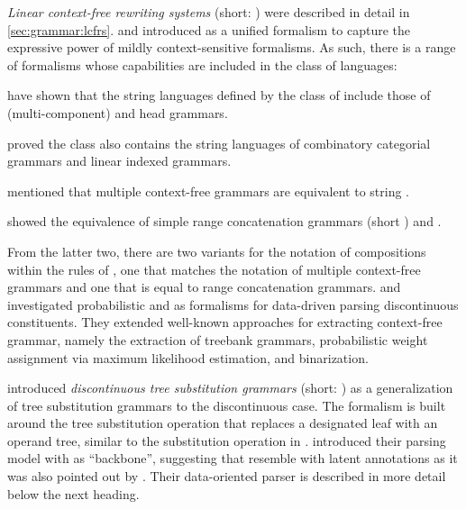 \documentclass[../document.tex]{subfiles}
\begin{document}
    \emph{Linear context-free rewriting systems} (short: ) were described in detail in \cref{sec:grammar:lcfrs}.
     and \citet{Weir88} introduced  as a unified formalism to capture the expressive power of mildly context-sensitive formalisms.
    As such, there is a range of formalisms whose capabilities are included in the class of  languages:
    \begin{compactitem}
        \item \citet{VijWeiJos87} have shown that the string languages defined by the class of  include those of (multi-component)  and head grammars.
        \item \citet{vijay1994equivalence} proved the class also contains the string languages of combinatory categorial grammars and linear indexed grammars.
        \item \citet{SekMatFujKas91} mentioned that multiple context-free grammars are equivalent to string .
        \item \citet{boullier1998proposal} showed the equivalence of simple range concatenation grammars (short ) and .
    \end{compactitem}
    From the latter two, there are two variants for the notation of compositions within the rules of , one that matches the notation of multiple context-free grammars and one that is equal to range concatenation grammars.
     and \citet{MailKal10} investigated probabilistic  and  as formalisms for data-driven parsing discontinuous constituents.
    They extended well-known approaches for extracting context-free grammar, namely the extraction of treebank grammars, probabilistic weight assignment via maximum likelihood estimation, and binarization.

     introduced \emph{discontinuous tree substitution grammars} (short: ) as a generalization of tree substitution grammars to the discontinuous case.
    The formalism is built around the tree substitution operation that replaces a designated leaf with an operand tree, similar to the substitution operation in .
     introduced their parsing model with  as ``backbone'', suggesting that  resemble  with latent annotations as it was also pointed out by \citet[Section~8.5.1]{Geb20}.
    Their data-oriented parser is described in more detail below the next heading.
\end{document}
